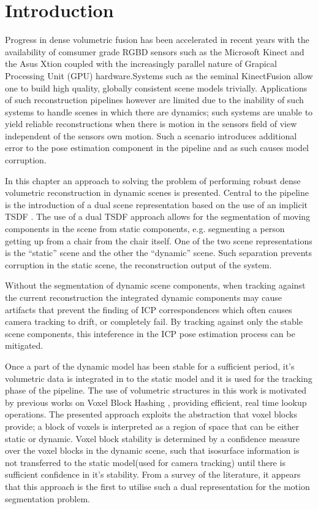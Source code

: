 
\section{Introduction}
\label{sec: moseg_introduction}
Progress in dense volumetric fusion has been accelerated in recent years with
the availability of comsumer grade RGBD sensors such as the Microsoft Kinect and
the Asus Xtion coupled with the increasingly parallel nature of Grapical Processing 
Unit (GPU) hardware.Systems such as the seminal KinectFusion \cite{Newcombe2011} 
allow one to build high quality, globally consistent scene models trivially. 
Applications of such reconstruction pipelines however are limited due to the 
inability of such systems to handle scenes in which there are dynamics; such 
systems are unable to yield reliable reconstructions when there is motion in the 
sensors field of view independent of the sensors own motion. Such a scenario introduces
additional error to the pose estimation component in the pipeline and as such
causes model corruption.

In this chapter an approach to solving the problem of performing robust
dense volumetric reconstruction in dynamic scenes is presented. Central to the
pipeline is the introduction of a dual scene representation based on the use
of an implicit TSDF \cite{Curless1996}. The use of a dual TSDF approach allows
for the segmentation of moving components in the scene from static components,
e.g. segmenting a person getting up from a chair from the chair itself. One of
the two scene representations is the ``static'' scene and the other the
``dynamic'' scene. Such separation prevents corruption in the static scene,
the reconstruction output of the system.

Without the segmentation of dynamic scene components, when tracking against the
current reconstruction the integrated dynamic components may cause artifacts
that prevent the finding of ICP correspondences which often causes camera
tracking to drift, or completely fail. By tracking against only the stable
scene components, this inteference in the ICP pose estimation process can be
mitigated.

Once a part of the dynamic model has been stable for a sufficient period, it's
volumetric data is integrated in to the static model and it is used for the
tracking phase of the pipeline. The use of volumetric structures in this work
is motivated by previous works on Voxel Block Hashing \cite{NieBner2013},
providing efficient, real time lookup operations. The presented approach
exploits the abstraction that voxel blocks provide; a block of voxels is
interpreted as a region of space that can be either static or dynamic.
Voxel block stability is determined by a confidence measure over the voxel
blocks in the dynamic scene, such that isosurface information is not transferred
to the static model(used for camera tracking) until there is sufficient
confidence in it's stability. From a survey of the literature, it appears that 
this approach is the first to utilise such a dual representation for the motion 
segmentation problem.

